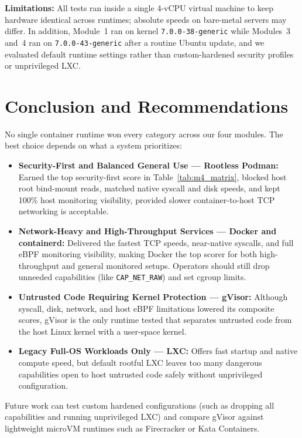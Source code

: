 \documentclass[conference]{IEEEtran}
\begin{document}
\textbf{Limitations:} All tests ran inside a single 4-vCPU virtual machine to keep hardware identical across runtimes; absolute speeds on bare-metal servers may differ. In addition, Module~1 ran on kernel \texttt{7.0.0-38-generic} while Modules~3 and~4 ran on \texttt{7.0.0-43-generic} after a routine Ubuntu update, and we evaluated default runtime settings rather than custom-hardened security profiles or unprivileged LXC.

\section{Conclusion and Recommendations}
No single container runtime won every category across our four modules. The best choice depends on what a system prioritizes:
\begin{itemize}
    \item \textbf{Security-First and Balanced General Use --- Rootless Podman:} Earned the top security-first score in Table~\ref{tab:m4_matrix}, blocked host root bind-mount reads, matched native syscall and disk speeds, and kept 100\% host monitoring visibility, provided slower container-to-host TCP networking is acceptable.
    \item \textbf{Network-Heavy and High-Throughput Services --- Docker and containerd:} Delivered the fastest TCP speeds, near-native syscalls, and full eBPF monitoring visibility, making Docker the top scorer for both high-throughput and general monitored setups. Operators should still drop unneeded capabilities (like \texttt{CAP\_NET\_RAW}) and set cgroup limits.
    \item \textbf{Untrusted Code Requiring Kernel Protection --- gVisor:} Although syscall, disk, network, and host eBPF limitations lowered its composite scores, gVisor is the only runtime tested that separates untrusted code from the host Linux kernel with a user-space kernel.
    \item \textbf{Legacy Full-OS Workloads Only --- LXC:} Offers fast startup and native compute speed, but default rootful LXC leaves too many dangerous capabilities open to host untrusted code safely without unprivileged configuration.
\end{itemize}

Future work can test custom hardened configurations (such as dropping all capabilities and running unprivileged LXC) and compare gVisor against lightweight microVM runtimes such as Firecracker or Kata Containers.
\end{document}
